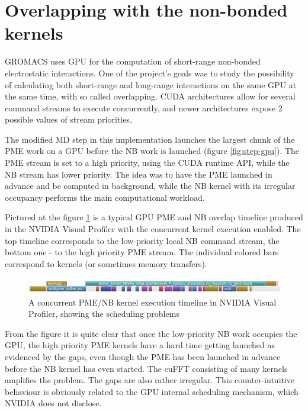 \documentclass[12pt,a4paper]{report}
\newcommand{\draft}[1]{#1}
\begin{document}

\FloatBarrier
\section{Overlapping with the non-bonded kernels}\label{overlapped}

GROMACS uses GPU for the computation of short-range non-bonded electrostatic interactions. One of the project's goals was to study the possibility of calculating both short-range and long-range interactions on the same GPU at the same time, with so called overlapping. CUDA architectures allow for several command streams to execute concurrently, and newer architectures expose 2 possible values of stream priorities.

The modified MD step in this implementation launches the largest chunk of the PME work on a GPU before the NB work is launched (figure \ref{fig:step-gpu}). The PME stream is set to a high priority, using the CUDA runtime API, while the NB stream has lower priority. 
The idea was to have the PME launched in advance and be computed in background, while the NB kernel with its irregular occupancy performs the main computational workload.

Pictured at the figure \ref{fig:overlap} is a typical GPU PME and NB overlap timeline produced in the NVIDIA Visual Profiler with the concurrent kernel execution enabled.
The top timeline corresponds to the low-priority local NB command stream, the bottom one - to the high priority PME stream. The individual colored bars correspond to kernels (or sometimes memory transfers). 

\FloatBarrier
\begin{figure} [h!]
    \centering
    \includegraphics[width=1\textwidth]{pics/overlap-crop.png}
    \caption{A concurrent PME/NB kernel execution timeline in NVIDIA Visual Profiler, showing the scheduling problems}
    \label{fig:overlap}
\end{figure}
\FloatBarrier

From the figure it is quite clear that once the low-priority NB work occupies the GPU, the high priority PME kernels have a hard time getting launched as evidenced by the gaps, even though the PME has been launched in advance before the NB kernel has even started. The cuFFT consisting of many kernels amplifies the problem. The gaps are also rather irregular. This counter-intuitive behaviour is obviously related to the GPU internal scheduling mechanism, which NVIDIA does not disclose. 
\end{document}
